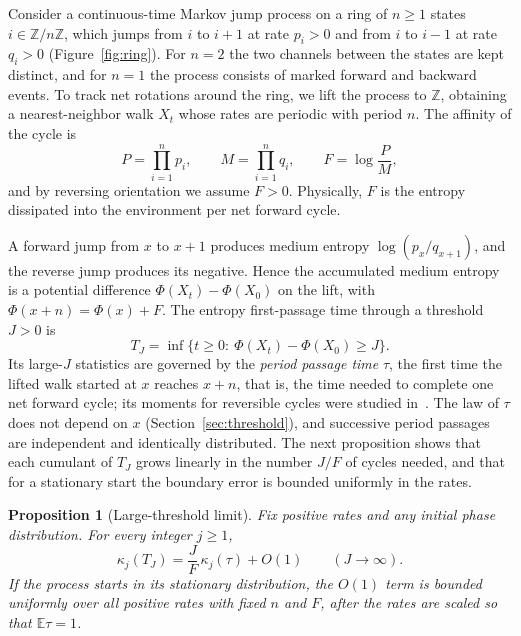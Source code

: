 \documentclass[11pt]{article}
\newtheorem{proposition}[theorem]{Proposition}
\theoremstyle{remark}
\newcommand{\E}{\mathbb E}
\begin{document}
Consider a continuous-time Markov jump process on a ring of $n\ge1$ states
$i\in\mathbb Z/n\mathbb Z$, which jumps from $i$ to $i+1$ at rate $p_i>0$ and
from $i$ to $i-1$ at rate $q_i>0$ (Figure~\ref{fig:ring}). For $n=2$ the two
channels between the states are kept distinct, and for $n=1$ the process
consists of marked forward and backward events. To track net rotations
around the ring, we lift the process to $\mathbb Z$, obtaining a
nearest-neighbor walk $X_t$ whose rates are periodic with period $n$. The
affinity of the cycle is
\begin{equation}\label{eq:F}
P=\prod_{i=1}^np_i,\qquad M=\prod_{i=1}^nq_i,\qquad F=\log\frac PM,
\end{equation}
and by reversing orientation we assume $F>0$. Physically, $F$ is the
entropy dissipated into the environment per net forward cycle.

A forward jump from $x$ to $x+1$ produces medium entropy
$\log(p_x/q_{x+1})$, and the reverse jump produces its negative. Hence the
accumulated medium entropy is a potential difference $\Phi(X_t)-\Phi(X_0)$
on the lift, with $\Phi(x+n)=\Phi(x)+F$. The entropy first-passage time
through a threshold $J>0$ is
\[
T_J=\inf\{t\ge0:\ \Phi(X_t)-\Phi(X_0)\ge J\}.
\]
Its large-$J$ statistics are governed by the \emph{period passage time}
$\tau$, the first time the lifted walk started at $x$ reaches $x+n$, that
is, the time needed to complete one net forward cycle; its moments for
reversible cycles were studied in~\cite{wierenga}. The law of $\tau$
does not depend on $x$ (Section~\ref{sec:threshold}), and successive period
passages are independent and identically distributed. The next proposition
shows that each cumulant of $T_J$ grows linearly in the number $J/F$ of
cycles needed, and that for a stationary start the boundary error is bounded
uniformly in the rates.

\begin{proposition}[Large-threshold limit]\label{prop:threshold}
Fix positive rates and any initial phase distribution. For every integer
$j\ge1$,
\[
\kappa_j(T_J)=\frac JF\,\kappa_j(\tau)+O(1)\qquad(J\to\infty).
\]
If the process starts in its stationary distribution, the $O(1)$ term is
bounded uniformly over all positive rates with fixed $n$ and $F$, after
the rates are scaled so that $\E\tau=1$.
\end{proposition}
\end{document}
